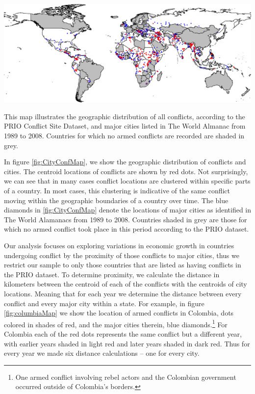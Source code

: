 \begin{amssidewaysfigure}
	\centering
	\includegraphics[width=1\textwidth]{CityConfMap-crop}
	\caption{This map illustrates the geographic distribution of all conflicts, according to the PRIO Conflict Site Dataset, and major cities listed in The World Almanac from 1989 to 2008. Countries for which no armed conflicts are recorded are shaded in grey.}
	\label{fig:CityConfMap}
\end{amssidewaysfigure}
\FloatBarrier

In figure \ref{fig:CityConfMap}, we show the geographic distribution of conflicts and cities. The centroid locations of conflicts are shown by red dots. Not surprisingly, we can see that in many cases conflict locations are clustered within specific parts of a country. In most cases, this clustering is indicative of the same conflict moving within the geographic boundaries of a country over time. The blue diamonds in \ref{fig:CityConfMap} denote the locations of major cities as identified in The World Alamanacs from 1989 to 2008. Countries shaded in grey are those for which no armed conflict took place in this period according to the PRIO dataset.  

Our analysis focuses on exploring variations in economic growth in countries undergoing conflict by the proximity of those conflicts to major cities, thus we restrict our sample to only those countries that are listed as having conflicts in the PRIO dataset. To determine proximity, we calculate the distance in kilometers between the centroid of each of the conflicts with the centroids of city locations. Meaning that for each year we determine the distance between every conflict and every major city within a state. For example, in figure \ref{fig:columbiaMap} we show the location of armed conflicts in Colombia, dots colored in shades of red, and the major cities therein, blue diamonds.\footnote{One armed conflict involving rebel actors and the Colombian government occurred outside of Colombia's borders.} For Colombia each of the red dots represents the same conflict but a different year, with earlier years shaded in light red and later years shaded in dark red. Thus for every year we made six distance calculations -- one for every city.

